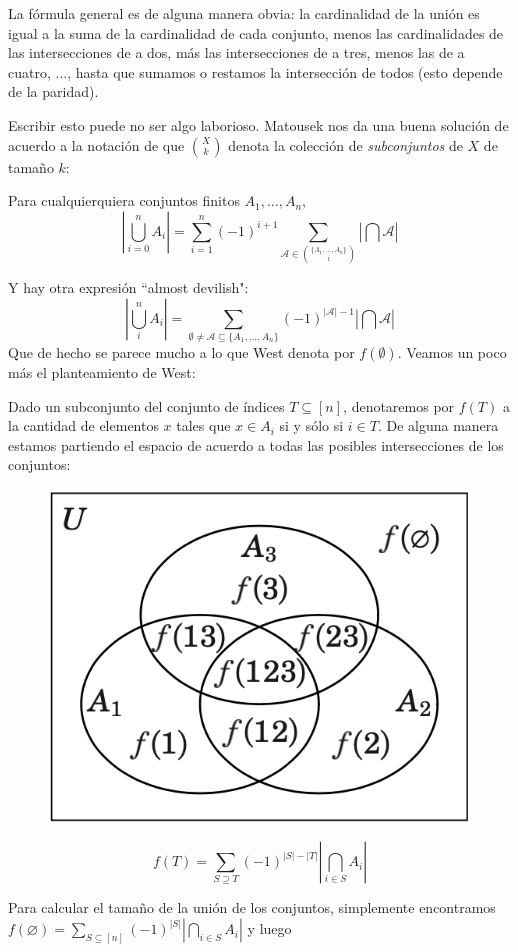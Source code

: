 \documentclass[spanish]{book}
\theoremstyle{definition}
\begin{document}
La fórmula general es de alguna manera obvia: la cardinalidad de la unión es igual a la suma de la cardinalidad de cada conjunto, menos las cardinalidades de las intersecciones de a dos, más las intersecciones de a tres, menos las de a cuatro, ..., hasta que sumamos o restamos la intersección de todos (esto depende de la paridad).

Escribir esto puede no ser algo laborioso. Matousek nos da una buena solución de acuerdo a la notación de que ${X\choose k}$ denota la colección de \textit{subconjuntos} de $X$ de tamaño $k$:
\begin{teo}
	Para cualquierquiera conjuntos finitos $A_1,\ldots,A_n$,
	\[\left|\bigcup_{i=0}^nA_i\right|=\sum_{i=1}^n(-1)^{i+1}\sum_{\mathcal{A}\in{\{A_1,\ldots,A_n\}\choose i}}\left|\bigcap \mathcal{A}\right|\]
\end{teo}
Y hay otra expresión ``almost devilish":
\[\left|\bigcup_i^nA_i\right|=\sum_{\emptyset\neq\mathcal{A}\subseteq \{A_1,\ldots,A_n\}}(-1)^{|\mathcal{A}|-1}\left|\bigcap\mathcal{A}\right|\]
Que de hecho se parece mucho a lo que West denota por $f(\emptyset)$. Veamos un poco más el planteamiento de West:

Dado un subconjunto del conjunto de índices $T\subseteq[n]$, denotaremos por $f(T)$ a la cantidad de elementos $x$ tales que $x\in A_i$ si y sólo si $i\in T$. De alguna manera estamos partiendo el espacio de acuerdo a todas las posibles intersecciones de los conjuntos:
\begin{figure}[H]
	\centering
	\includegraphics[width=0.3\linewidth]{PIE}
\end{figure}
\begin{teo}[PIE]
	\[f(T)=\sum_{S\supseteq T}(-1)^{|S|-|T|}\left|\bigcap_{i\in S}A_i\right|\]
\end{teo}
Para calcular el tamaño de la unión de los conjuntos, simplemente encontramos $f(\varnothing)=\sum_{S\subseteq[n]}(-1)^{|S|}\left|\bigcap_{i\in S}A_i\right|$ y luego 
\end{document}
